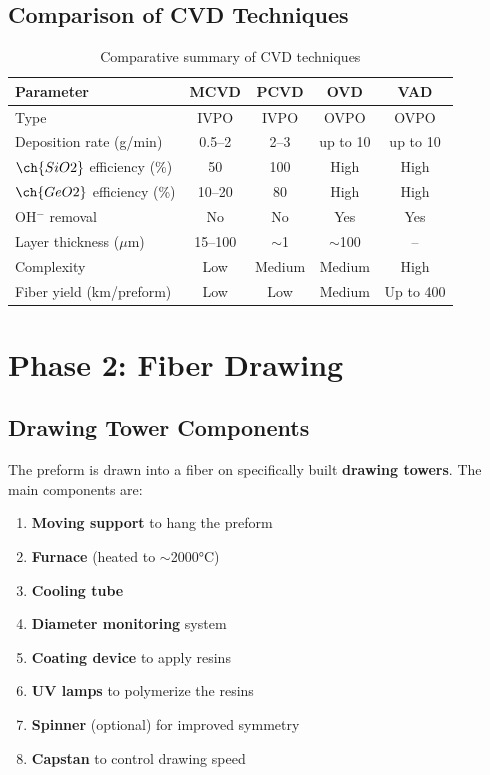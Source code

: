\documentclass[a4paper, 11pt]{article}
\begin{document}
\subsection{Comparison of CVD Techniques}

\begin{table}[H]
    \centering
    \caption{Comparative summary of CVD techniques}
    \label{tab:cvd_comparison}
    \begin{tabularx}{\textwidth}{lcccc}
        \toprule
        \textbf{Parameter} & \textbf{MCVD} & \textbf{PCVD} & \textbf{OVD} & \textbf{VAD} \\
        \midrule
        Type & IVPO & IVPO & OVPO & OVPO \\
        Deposition rate (g/min) & 0.5--2 & 2--3 & up to 10 & up to 10 \\
        $\ch{SiO2}$ efficiency (\%) & 50 & 100 & High & High \\
        $\ch{GeO2}$ efficiency (\%) & 10--20 & 80 & High & High \\
        OH$^-$ removal & No & No & Yes & Yes \\
        Layer thickness ($\mu$m) & 15--100 & $\sim$1 & $\sim$100 & -- \\
        Complexity & Low & Medium & Medium & High \\
        Fiber yield (km/preform) & Low & Low & Medium & Up to 400 \\
        \bottomrule
    \end{tabularx}
\end{table}

\section{Phase 2: Fiber Drawing}

\subsection{Drawing Tower Components}

The preform is drawn into a fiber on specifically built \textbf{drawing towers}. The main components are:

\begin{enumerate}[leftmargin=*]
    \item \textbf{Moving support} to hang the preform
    \item \textbf{Furnace} (heated to $\sim$2000°C)
    \item \textbf{Cooling tube}
    \item \textbf{Diameter monitoring} system
    \item \textbf{Coating device} to apply resins
    \item \textbf{UV lamps} to polymerize the resins
    \item \textbf{Spinner} (optional) for improved symmetry
    \item \textbf{Capstan} to control drawing speed
\end{enumerate}
\end{document}
